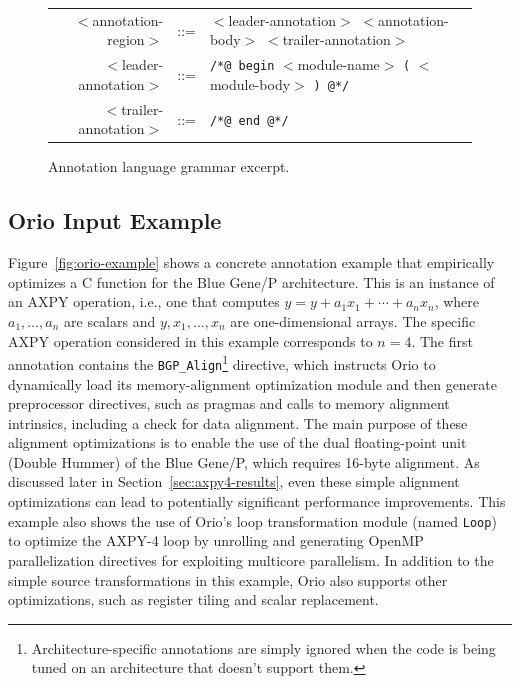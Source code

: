 \begin{figure}[thb]
\begin{center} 
\begin{tabular}{rrl} 
$<$annotation-region$>$ & ::= & $<$leader-annotation$>$ $<$annotation-body$>$ $<$trailer-annotation$>$\\ 
$<$leader-annotation$>$ & ::= & \texttt{/*@ begin} $<$module-name$>$ \texttt{(} $<$module-body$>$ \texttt{) @*/} \\
$<$trailer-annotation$>$ & ::= & \texttt{/*@ end @*/} \\
\end{tabular} 
\end{center}  
\vspace{-.1in}
\caption{Annotation language grammar excerpt.}  
\label{fig:ann-lang}
\end{figure}  

\subsection{Orio Input Example}
\label{sec:example}

Figure~\ref{fig:orio-example} shows a concrete annotation example that
empirically optimizes a C function for the Blue Gene/P
architecture. This is an instance of an AXPY operation, i.e., one that computes
$y=y+a_1 x_1+\cdots+a_n x_n$, where $a_1,\ldots,a_n$ are scalars and
$y,x_1,\ldots,x_n$ are one-dimensional arrays. The specific AXPY operation
considered in this example corresponds to $n=4$. The first annotation contains the
\texttt{BGP\_Align}\footnote{Architecture-specific annotations are simply ignored when the
code is being tuned on an architecture that doesn't support them.} directive,
which instructs Orio to dynamically load its memory-alignment optimization
module and then generate preprocessor directives, such as pragmas and calls
to memory alignment intrinsics, including a check for data alignment. The
main purpose of these alignment optimizations is to enable the use of the
dual floating-point unit (Double Hummer) of the Blue Gene/P, which requires
16-byte alignment. As discussed later in Section~\ref{sec:axpy4-results},
even these simple alignment optimizations can lead to potentially significant
performance improvements. This example also shows the use of Orio's loop
transformation module (named \texttt{Loop}) to optimize the AXPY-4 loop by
unrolling and generating OpenMP parallelization directives for exploiting
multicore parallelism. In addition to the simple source transformations in
this example, Orio also supports other optimizations, such as register
tiling and scalar replacement.

